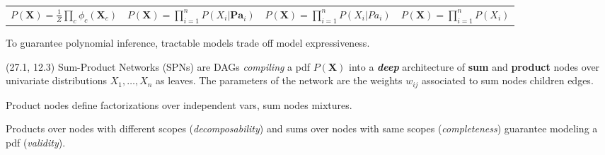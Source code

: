 \documentclass[final]{beamer}
\begin{document}
\begin{frame}{}
\begin{textblock}{25.7}
\begin{table}[!ht]
\begin{tabular}{c c c c}
        \tiny  $P(\mathbf{X})=\frac{1}{Z}\prod\limits_{c}\phi_{c}(\mathbf{X}_{c})$ & 
        \tiny  $P(\mathbf{X})=\prod\limits_{i=1}^nP(X_{i}|\mathbf{Pa}_{i})$&
        \tiny $P(\mathbf{X})=\prod\limits_{i=1}^nP(X_{i}|Pa_{i})$ &
        \tiny $P(\mathbf{X})=\prod\limits_{i=1}^nP(X_{i})$                                                              
      \end{tabular}\bigskip
      
    \end{table}

    To guarantee polynomial inference, tractable models trade off
    model expressiveness.
  \end{textblock}
  
  \begin{textblock}{25.7}(27.1, 12.3)
    \footnotesize
    Sum-Product Networks (SPNs) are DAGs
    \emph{compiling} a pdf $P(\mathbf{X})$ into a \textbf{\emph{deep}} architecture of \textbf{sum}
    and \textbf{product} nodes over univariate distributions $X_1,\dots,X_n$ as leaves.
    The parameters of the network are the weights $w_{ij}$ associated to sum
    nodes children edges.\par\bigskip
    
    Product nodes define factorizations over independent vars, sum
    nodes mixtures.\par\bigskip
    
    
    Products over nodes with different scopes (\emph{decomposability}) and
    sums over nodes with same scopes (\emph{completeness}) guarantee modeling
    a pdf (\emph{validity}).\par\bigskip
    

\end{textblock}
\end{frame}
\end{document}
